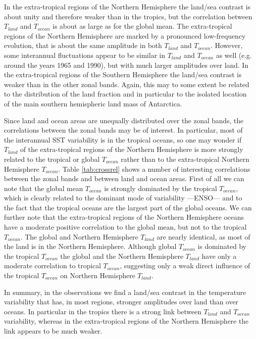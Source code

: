 In the extra-tropical regions of the Northern Hemisphere the land/sea contrast 
is about unity and therefore weaker than in the tropics, but the correlation 
between $T_{land}$ and $T_{ocean}$ is about as large as for the global mean.  
The extra-tropical regions of the Northern Hemisphere are marked by a pronounced 
low-frequency evolution, that is about the same amplitude in both $T_{land}$ and 
$T_{ocean}$. However, some interannual fluctuations appear to be similar in  
$T_{land}$ and $T_{ocean}$ as well (e.g. around the years 1965 and 1990), but 
with much larger amplitudes over land.  In the extra-tropical regions of the 
Southern Hemisphere the land/sea contrast is weaker than in the other zonal 
bands. Again, this may to some extent be related to the distribution of the land 
fraction and in particular to the isolated location of the main southern 
hemispheric land mass of Antarctica.

Since land and ocean areas are unequally distributed over the zonal bands, the 
correlations between the zonal bands may be of interest. In particular, most of 
the interannual SST variability is in the tropical oceans, so one may wonder if 
$T_{land}$ of the extra-tropical regions of the Northern Hemisphere is more 
strongly related to the tropical or global $T_{ocean}$ rather than to the 
extra-tropical Northern Hemisphere $T_{ocean}$. Table \ref{tab:crossrel} shows a 
number of interesting correlations between the zonal bands and between land and 
ocean areas.  First of all we can note that the global mean $T_{ocean}$ is 
strongly dominated by the tropical $T_{ocean}$, which is clearly related to the 
dominant mode of variability ---ENSO--- and to the fact that the tropical oceans 
are the largest part of the global oceans. We can further note that the 
extra-tropical regions of the Northern Hemisphere oceans have a moderate 
positive correlation to the global mean, but not to the tropical $T_{ocean}$.  
The global and Northern Hemisphere $T_{land}$ are nearly identical, as most of 
the land is in the Northern Hemisphere. Although global $T_{ocean}$ is dominated 
by the tropical $T_{ocean}$ the global and the  Northern Hemisphere $T_{land}$ 
have only a moderate correlation to tropical $T_{ocean}$, suggesting only a weak 
direct influence of the tropical $T_{ocean}$ on Northern Hemisphere $T_{land}$.

In summary, in the observations we find a land/sea contrast in the temperature 
variability that has, in most regions, stronger amplitudes over land than over 
oceans. In particular in the tropics there is a strong link between $T_{land}$ 
and $T_{ocean}$ variability, whereas in the extra-tropical regions of the 
Northern Hemisphere the link appears to be much weaker.

